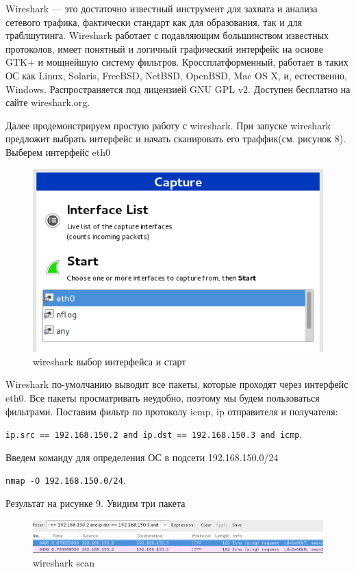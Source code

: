 \documentclass[11pt, a4paper]{article}		%
\begin{document}
Wireshark — это достаточно известный инструмент для захвата и анализа сетевого трафика, фактически стандарт как для образования, так и для траблшутинга. 
Wireshark работает с подавляющим большинством известных протоколов, имеет понятный и логичный графический интерфейс на основе GTK+ и мощнейшую систему фильтров.
Кроссплатформенный, работает в таких ОС как Linux, Solaris, FreeBSD, NetBSD, OpenBSD, Mac OS X, и, естественно, Windows. Распространяется под лицензией GNU GPL v2. Доступен бесплатно на сайте wireshark.org.

Далее продемонстрируем простую работу с wireshark. При запуске wireshark предложит выбрать интерфейс и начать сканировать его траффик(см. рисунок 8). Выберем интерфейс eth0

\begin{figure}[h!]
\centering
\includegraphics[scale=0.8]{res/wireshark_int}
\caption{wireshark выбор интерфейса и старт}
\end{figure}

Wireshark по-умолчанию выводит все пакеты, которые проходят через интерфейс eth0. Все пакеты просматривать неудобно, поэтому мы будем пользоваться фильтрами. Поставим фильтр по протоколу icmp, ip отправителя и получателя: 

\verb'ip.src == 192.168.150.2 and ip.dst == 192.168.150.3 and icmp'. 

Введем команду для определения ОС в подсети 192.168.150.0/24 

\verb'nmap -O 192.168.150.0/24'.

Результат на рисунке 9. Увидим три пакета

\begin{figure}[h!]
\centering
\includegraphics[scale=0.8]{res/wireshark_scan_icmp}
\caption{wireshark scan}
\end{figure}
\end{document}
